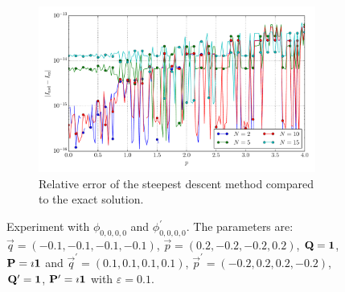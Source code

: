 \documentclass[a4paper,10pt]{article}
\begin{document}
\begin{figure}[ht!]
\begin{subfigure}[t]{0.5\linewidth}
    \includegraphics[width=\linewidth]{./plots/tp_4d_conv_p_(0,0,0,0)_(0,0,0,0)_err_rel_nsd.pdf}
    \caption{Relative error of the steepest descent method compared to the exact solution.}
    \label{fig:tp_4d_conv_p_0000_0000_err_rel_nsd}
  \end{subfigure}
  \label{fig:tp_4d_conv_p_0000_0000}
  \caption{Experiment with $\phi_{0,0,0,0}$ and $\phi_{0,0,0,0}^{\prime}$.
  The parameters are:
  $\vec{q} = (-0.1, -0.1, -0.1, -0.1)$,
  $\vec{p} = ( 0.2, -0.2, -0.2,  0.2)$,
  $\mathbf{Q} = \mathbf{1}$,
  $\mathbf{P} = \imath \mathbf{1}$
  and
  $\vec{q}^\prime = ( 0.1, 0.1, 0.1,  0.1)$,
  $\vec{p}^\prime = (-0.2, 0.2, 0.2, -0.2)$,
  $\mathbf{Q}^\prime = \mathbf{1}$,
  $\mathbf{P}^\prime = \imath \mathbf{1}$
  with $\varepsilon=0.1$.}
\end{figure}
\end{document}
